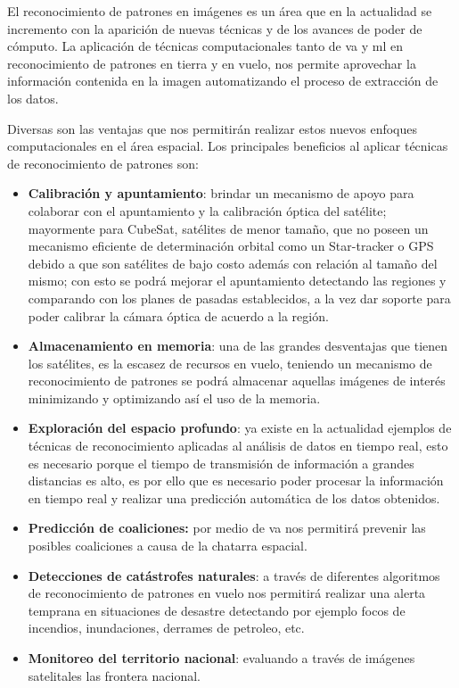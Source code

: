 El reconocimiento de patrones en imágenes es un área que en la actualidad se incremento con la aparición de nuevas técnicas y de los avances de poder de cómputo. La aplicación de técnicas computacionales tanto de  \ac{va} y \ac{ml} en reconocimiento de patrones  en tierra y en vuelo, nos permite aprovechar la información contenida en la imagen  automatizando el proceso de extracción de los datos.

Diversas son las ventajas que nos permitirán realizar estos nuevos enfoques computacionales en el área espacial. Los principales beneficios al aplicar técnicas de reconocimiento de patrones son: 
\begin{itemize}
\item \textbf{Calibración y apuntamiento}: brindar un mecanismo de apoyo para colaborar con el apuntamiento y la calibración óptica del satélite; mayormente para CubeSat, satélites de menor tamaño, que no poseen un mecanismo eficiente de determinación orbital como un Star-tracker o GPS debido a que son satélites de bajo costo además con relación al tamaño del mismo; con esto se podrá mejorar el apuntamiento detectando las regiones y comparando con los planes de pasadas  establecidos, a la vez dar soporte para poder calibrar la cámara óptica de acuerdo a la región.
\item \textbf{Almacenamiento en memoria}: una de las grandes desventajas que tienen los satélites, es la escasez de recursos en vuelo, teniendo un mecanismo de reconocimiento de patrones se podrá almacenar aquellas imágenes de interés minimizando y optimizando  así el uso de la memoria.
\item \textbf{Exploración del espacio profundo}: ya existe en la actualidad ejemplos de técnicas de reconocimiento aplicadas al análisis de datos en tiempo real, esto es necesario  porque el tiempo de transmisión de información a grandes distancias es alto, es por ello que es necesario poder procesar la información en tiempo real y realizar una predicción automática de los datos obtenidos.
\item \textbf{Predicción de coaliciones:} por medio de \ac{va} nos permitirá prevenir las posibles coaliciones a causa de la chatarra espacial. 
\item \textbf{Detecciones de catástrofes naturales}: a través de diferentes algoritmos de reconocimiento de patrones en vuelo nos permitirá realizar una alerta temprana en situaciones de desastre detectando por ejemplo focos de incendios, inundaciones, derrames de petroleo, etc.
\item \textbf{Monitoreo del territorio nacional}: evaluando a través de imágenes satelitales las frontera nacional.
\end{itemize}

